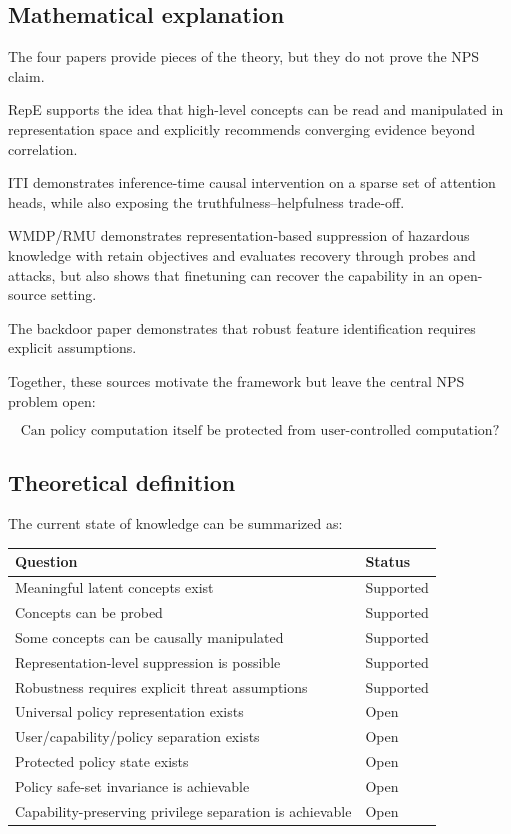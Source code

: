 \documentclass[11pt]{article}
\begin{document}
\subsection*{Mathematical explanation}

The four papers provide pieces of the theory, but they do not prove the NPS
claim.

RepE supports the idea that high-level concepts can be read and manipulated
in representation space and explicitly recommends converging evidence beyond
correlation.

ITI demonstrates inference-time causal intervention on a sparse set of
attention heads, while also exposing the truthfulness--helpfulness trade-off.

WMDP/RMU demonstrates representation-based suppression of hazardous knowledge
with retain objectives and evaluates recovery through probes and attacks, but
also shows that finetuning can recover the capability in an open-source
setting.

The backdoor paper demonstrates that robust feature identification requires
explicit assumptions.

Together, these sources motivate the framework but leave the central NPS
problem open:

\begin{equation}
\boxed{
\text{Can policy computation itself be protected from user-controlled
computation?}
}
\end{equation}

\subsection*{Theoretical definition}

The current state of knowledge can be summarized as:

\begin{center}
\begin{tabular}{ll}
\toprule
Question & Status \\
\midrule
Meaningful latent concepts exist & Supported \\
Concepts can be probed & Supported \\
Some concepts can be causally manipulated & Supported \\
Representation-level suppression is possible & Supported \\
Robustness requires explicit threat assumptions & Supported \\
Universal policy representation exists & Open \\
User/capability/policy separation exists & Open \\
Protected policy state exists & Open \\
Policy safe-set invariance is achievable & Open \\
Capability-preserving privilege separation is achievable & Open \\
\bottomrule
\end{tabular}
\end{center}
\end{document}
